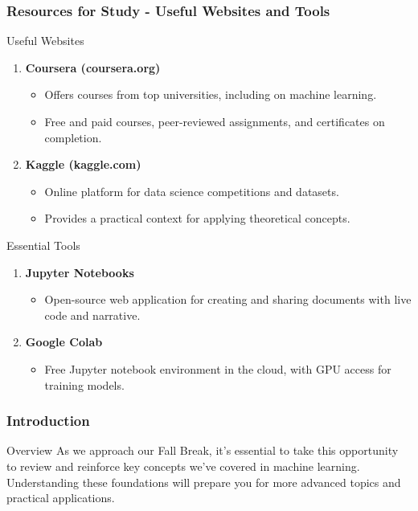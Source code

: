 \documentclass[aspectratio=169]{beamer}
\begin{document}
\begin{frame}[fragile]
    \frametitle{Resources for Study - Useful Websites and Tools}
    \begin{block}{Useful Websites}
        \begin{enumerate}
            \item \textbf{Coursera (coursera.org)}
            \begin{itemize}
                \item Offers courses from top universities, including on machine learning.
                \item Free and paid courses, peer-reviewed assignments, and certificates on completion.
            \end{itemize}
            
            \item \textbf{Kaggle (kaggle.com)}
            \begin{itemize}
                \item Online platform for data science competitions and datasets.
                \item Provides a practical context for applying theoretical concepts.
            \end{itemize}
        \end{enumerate}
    \end{block}

    \begin{block}{Essential Tools}
        \begin{enumerate}
            \item \textbf{Jupyter Notebooks}
            \begin{itemize}
                \item Open-source web application for creating and sharing documents with live code and narrative.
            \end{itemize}
            
            \item \textbf{Google Colab}
            \begin{itemize}
                \item Free Jupyter notebook environment in the cloud, with GPU access for training models.
            \end{itemize}
        \end{enumerate}
    \end{block}
\end{frame}

\begin{frame}[fragile]
    \frametitle{Introduction}
    \begin{block}{Overview}
        As we approach our Fall Break, it's essential to take this opportunity to review and reinforce key concepts we've covered in machine learning. Understanding these foundations will prepare you for more advanced topics and practical applications.
    \end{block}
\end{frame}
\end{document}
